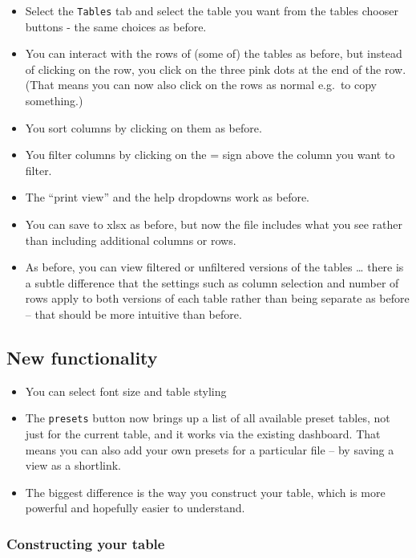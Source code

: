 \documentclass[
]{book}
\providecommand{\tightlist}{%
  \setlength{\itemsep}{0pt}\setlength{\parskip}{0pt}}
\begin{document}
\begin{itemize}
\item
  Select the \texttt{Tables} tab and select the table you want from the tables chooser buttons - the same choices as before.
\item
  You can interact with the rows of (some of) the tables as before, but instead of clicking on the row, you click on the three pink dots at the end of the row. (That means you can now also click on the rows as normal e.g.~to copy something.)
\item
  You sort columns by clicking on them as before.
\item
  You filter columns by clicking on the = sign above the column you want to filter.
\item
  The ``print view'' and the help dropdowns work as before.
\item
  You can save to xlsx as before, but now the file includes what you see rather than including additional columns or rows.
\item
  As before, you can view filtered or unfiltered versions of the tables \ldots{} there is a subtle difference that the settings such as column selection and number of rows apply to both versions of each table rather than being separate as before -- that should be more intuitive than before.
\end{itemize}

\hypertarget{new-functionality}{%
\subsection{New functionality}\label{new-functionality}}

\begin{itemize}
\tightlist
\item
  You can select font size and table styling
\item
  The \texttt{presets} button now brings up a list of all available preset tables, not just for the current table, and it works via the existing dashboard. That means you can also add your own presets for a particular file -- by saving a view as a shortlink.
\item
  The biggest difference is the way you construct your table, which is more powerful and hopefully easier to understand.
\end{itemize}

\hypertarget{constructing-your-table}{%
\subsubsection{Constructing your table}\label{constructing-your-table}}
\end{document}
